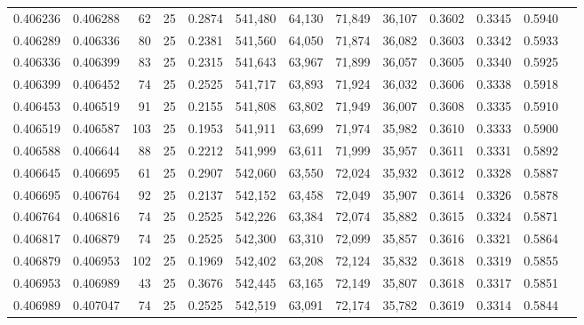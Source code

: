 \begin{tabular}{rrrrrrrrrrrrr}
0.406236 & 0.406288 &    62 &  25 &                                     0.2874 & 541,480 &  64,130 &  71,849 &  36,107 & 0.3602 & 0.3345 & 0.5940 \\
0.406289 & 0.406336 &    80 &  25 &                                     0.2381 & 541,560 &  64,050 &  71,874 &  36,082 & 0.3603 & 0.3342 & 0.5933 \\
0.406336 & 0.406399 &    83 &  25 &                                     0.2315 & 541,643 &  63,967 &  71,899 &  36,057 & 0.3605 & 0.3340 & 0.5925 \\
0.406399 & 0.406452 &    74 &  25 &                                     0.2525 & 541,717 &  63,893 &  71,924 &  36,032 & 0.3606 & 0.3338 & 0.5918 \\
0.406453 & 0.406519 &    91 &  25 &                                     0.2155 & 541,808 &  63,802 &  71,949 &  36,007 & 0.3608 & 0.3335 & 0.5910 \\
0.406519 & 0.406587 &   103 &  25 &                                     0.1953 & 541,911 &  63,699 &  71,974 &  35,982 & 0.3610 & 0.3333 & 0.5900 \\
0.406588 & 0.406644 &    88 &  25 &                                     0.2212 & 541,999 &  63,611 &  71,999 &  35,957 & 0.3611 & 0.3331 & 0.5892 \\
0.406645 & 0.406695 &    61 &  25 &                                     0.2907 & 542,060 &  63,550 &  72,024 &  35,932 & 0.3612 & 0.3328 & 0.5887 \\
0.406695 & 0.406764 &    92 &  25 &                                     0.2137 & 542,152 &  63,458 &  72,049 &  35,907 & 0.3614 & 0.3326 & 0.5878 \\
0.406764 & 0.406816 &    74 &  25 &                                     0.2525 & 542,226 &  63,384 &  72,074 &  35,882 & 0.3615 & 0.3324 & 0.5871 \\
0.406817 & 0.406879 &    74 &  25 &                                     0.2525 & 542,300 &  63,310 &  72,099 &  35,857 & 0.3616 & 0.3321 & 0.5864 \\
0.406879 & 0.406953 &   102 &  25 &                                     0.1969 & 542,402 &  63,208 &  72,124 &  35,832 & 0.3618 & 0.3319 & 0.5855 \\
0.406953 & 0.406989 &    43 &  25 &                                     0.3676 & 542,445 &  63,165 &  72,149 &  35,807 & 0.3618 & 0.3317 & 0.5851 \\
0.406989 & 0.407047 &    74 &  25 &                                     0.2525 & 542,519 &  63,091 &  72,174 &  35,782 & 0.3619 & 0.3314 & 0.5844 \\

\end{tabular}
